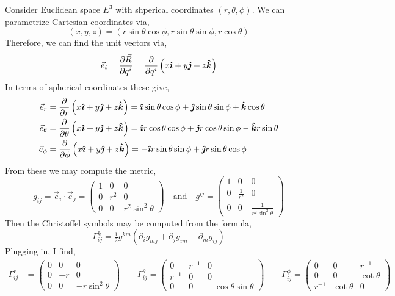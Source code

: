 \documentclass[12pt]{article}
\begin{document}
Consider Euclidean space $E^3$ with shperical coordinates $(r, \theta, \phi)$. We can parametrize Cartesian coordinates via,
\[ (x,y,z) = (r \sin{\theta} \cos{\phi}, r \sin{\theta} \sin{\phi}, r \cos{\theta}) \]
Therefore, we can find the unit vectors via,
\[ \vec{e}_i = \frac{\partial{\vec{R}}}{\partial{q^i}} = \frac{\partial{}}{\partial{q^i}} \left( x \boldsymbol{\hat{\imath}} + y \boldsymbol{\hat{\jmath}} + z \boldsymbol{\hat{k}} \right) \]
In terms of spherical coordinates these give,
\begin{align*}
\vec{e}_r & = \frac{\partial{}}{\partial{r}} \left( x \boldsymbol{\hat{\imath}} + y \boldsymbol{\hat{\jmath}} + z \boldsymbol{\hat{k}} \right) = \boldsymbol{\hat{\imath}} \sin{\theta} \cos{\phi} + \boldsymbol{\hat{\jmath}} \sin{\theta} \sin{\phi} + \boldsymbol{\hat{k}} \cos{\theta}  
\\
\vec{e}_\theta & = \frac{\partial{}}{\partial{\theta}} \left( x \boldsymbol{\hat{\imath}} + y \boldsymbol{\hat{\jmath}} + z \boldsymbol{\hat{k}} \right) = \boldsymbol{\hat{\imath}} r \cos{\theta} \cos{\phi} + \boldsymbol{\hat{\jmath}} r \cos{\theta} \sin{\phi} - \boldsymbol{\hat{k}} r \sin{\theta} 
\\
\vec{e}_\phi & = \frac{\partial{}}{\partial{\phi}} \left( x \boldsymbol{\hat{\imath}} + y \boldsymbol{\hat{\jmath}} + z \boldsymbol{\hat{k}} \right) = - \boldsymbol{\hat{\imath}} r \sin{\theta} \sin{\phi} + \boldsymbol{\hat{\jmath}} r \sin{\theta} \cos{\phi} 
\end{align*}
From these we may compute the metric,
\[ g_{ij} = \vec{e}_i \cdot \vec{e}_j = 
\begin{pmatrix}
1 & 0 & 0
\\
0 & r^2 & 0 
\\
0 & 0 & r^2 \sin^2{\theta} 
\end{pmatrix} 
\quad \text{and} \quad g^{ij} = 
\begin{pmatrix}
1 & 0 & 0
\\
0 & \frac{1}{r^2} & 0 
\\
0 & 0 & \frac{1}{r^2 \sin^{2}{\theta}}
\end{pmatrix}  \]
Then the Christoffel symbols may be computed from the formula,
\[ \Gamma^k_{ij} = \tfrac{1}{2} g^{km} \left( \partial_i g_{mj} + \partial_j g_{im} - \partial_m g_{ij} \right) \]
Plugging in, I find,
\begin{align*}
\Gamma^r_{ij} & =
\begin{pmatrix}
0 & 0 & 0
\\
0 & -r & 0
\\
0 & 0 & -r \sin^{2}{\theta}
\end{pmatrix}
\quad \quad 
\Gamma^\theta_{ij} =
\begin{pmatrix}
0 & r^{-1} & 0
\\
r^{-1} & 0 & 0
\\
0 & 0 & - \cos{\theta} \sin{\theta}
\end{pmatrix}
\quad \quad 
\Gamma^\phi_{ij} =
\begin{pmatrix}
0 & 0 & r^{-1}
\\
0 & 0 & \cot{\theta}
\\
r^{-1} & \cot{\theta} & 0
\end{pmatrix}
\end{align*}
\end{document}
